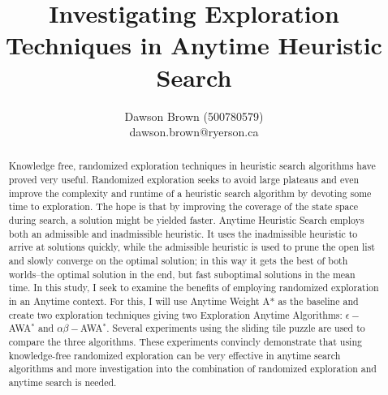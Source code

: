 \documentclass[letterpaper]{article}
\title{Investigating Exploration Techniques in Anytime Heuristic Search}
\author{Dawson Brown (500780579)\\dawson.brown@ryerson.ca}
\date{}
\begin{document}
\maketitle
\pagestyle{plain}

\begin{abstract}
    Knowledge free, randomized exploration techniques in heuristic search algorithms have proved very useful. Randomized exploration seeks to avoid large plateaus and even improve the complexity and runtime of a heuristic search algorithm by devoting some time to exploration. The hope is that by improving the coverage of the state space during search, a solution might be yielded faster. Anytime Heuristic Search employs both an admissible and inadmissible heuristic. It uses the inadmissible heuristic to arrive at solutions quickly, while the admissible heuristic is used to prune the open list and slowly converge on the optimal solution; in this way it gets the best of both worlds--the optimal solution in the end, but fast suboptimal solutions in the mean time. In this study, I seek to examine the benefits of employing randomized exploration in an Anytime context. For this, I will use Anytime Weight A* as the baseline and create two exploration techniques giving two Exploration Anytime Algorithms: $\epsilon-$AWA$^*$ and $\alpha\beta-$AWA$^*$. Several experiments using the sliding tile puzzle are used to compare the three algorithms. These experiments convincly demonstrate that using knowledge-free randomized exploration can be very effective in anytime search algorithms and more investigation into the combination of randomized exploration and anytime search is needed. 
\end{abstract}














\newpage

% 
\end{document}
